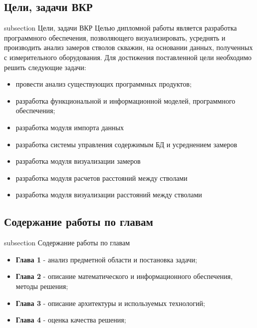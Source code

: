 \subsection*{Цели, задачи ВКР}
 {subsection} {Цели, задачи ВКР}
Целью дипломной работы является разработка программного обеспечения, позволяющего визуализировать, усреднять и производить анализ замеров стволов скважин,
на основании данных, полученных с измерительного оборудования. Для достижения поставленной цели необходимо решить следующие задачи:
\begin{itemize}
  \item провести анализ существующих программных продуктов;
  \item разработка функциональной и информационной моделей, программного обеспечения;
  \item разработка модуля импорта данных
  \item разработка системы управления содержимым БД и усреднением замеров
  \item разработка модуля визуализации замеров
  \item разработка модуля расчетов расстояний между стволами
  \item разработка модуля визуализации расстояний между стволами
\end{itemize}

\subsection*{Содержание работы по главам}
 {subsection} {Содержание работы по главам}

\begin{itemize}
  \item \textbf{Глава 1} - анализ предметной области и постановка задачи;
  \item \textbf{Глава 2} - описание математического и информационного обеспечения, методы решения;
  \item \textbf{Глава 3} - описание архитектуры и используемых технологий;
  \item \textbf{Глава 4} - оценка качества решения;
\end{itemize}
